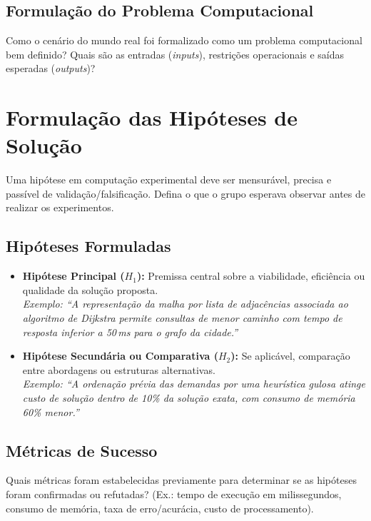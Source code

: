 \documentclass[11pt,a4paper]{article}
\begin{document}
\subsection{Formulação do Problema Computacional}
Como o cenário do mundo real foi formalizado como um problema computacional bem definido? Quais são as entradas (\textit{inputs}), restrições operacionais e saídas esperadas (\textit{outputs})?

\section{Formulação das Hipóteses de Solução}

\begin{instrucao}
Uma hipótese em computação experimental deve ser mensurável, precisa e passível de validação/falsificação. Defina o que o grupo esperava observar antes de realizar os experimentos.
\end{instrucao}

\subsection{Hipóteses Formuladas}
\begin{itemize}
    \item \textbf{Hipótese Principal ($H_1$):} Premissa central sobre a viabilidade, eficiência ou qualidade da solução proposta. \\
    \textit{Exemplo: ``A representação da malha por lista de adjacências associada ao algoritmo de Dijkstra permite consultas de menor caminho com tempo de resposta inferior a 50\,ms para o grafo da cidade.''}
    \item \textbf{Hipótese Secundária ou Comparativa ($H_2$):} Se aplicável, comparação entre abordagens ou estruturas alternativas. \\
    \textit{Exemplo: ``A ordenação prévia das demandas por uma heurística gulosa atinge custo de solução dentro de 10\% da solução exata, com consumo de memória 60\% menor.''}
\end{itemize}

\subsection{Métricas de Sucesso}
Quais métricas foram estabelecidas previamente para determinar se as hipóteses foram confirmadas ou refutadas? (Ex.: tempo de execução em milissegundos, consumo de memória, taxa de erro/acurácia, custo de processamento).
\end{document}
